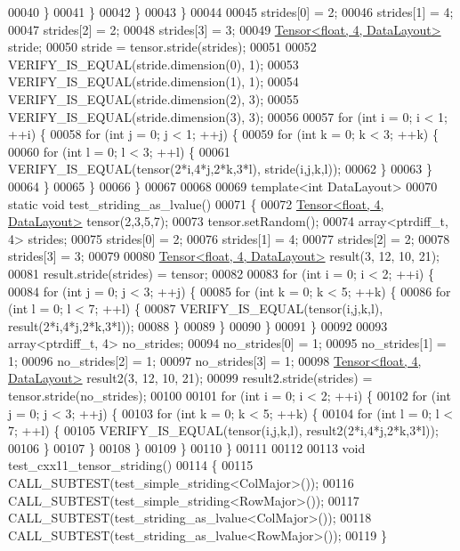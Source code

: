 \begin{DoxyCode}
00040         \}
00041       \}
00042     \}
00043   \}
00044 
00045   strides[0] = 2;
00046   strides[1] = 4;
00047   strides[2] = 2;
00048   strides[3] = 3;
00049   \hyperlink{class_eigen_1_1_tensor}{Tensor<float, 4, DataLayout>} stride;
00050   stride = tensor.stride(strides);
00051 
00052   VERIFY\_IS\_EQUAL(stride.dimension(0), 1);
00053   VERIFY\_IS\_EQUAL(stride.dimension(1), 1);
00054   VERIFY\_IS\_EQUAL(stride.dimension(2), 3);
00055   VERIFY\_IS\_EQUAL(stride.dimension(3), 3);
00056 
00057   \textcolor{keywordflow}{for} (\textcolor{keywordtype}{int} i = 0; i < 1; ++i) \{
00058     \textcolor{keywordflow}{for} (\textcolor{keywordtype}{int} j = 0; j < 1; ++j) \{
00059       \textcolor{keywordflow}{for} (\textcolor{keywordtype}{int} k = 0; k < 3; ++k) \{
00060         \textcolor{keywordflow}{for} (\textcolor{keywordtype}{int} l = 0; l < 3; ++l) \{
00061           VERIFY\_IS\_EQUAL(tensor(2*i,4*j,2*k,3*l), stride(i,j,k,l));
00062         \}
00063       \}
00064     \}
00065   \}
00066 \}
00067 
00068 
00069 \textcolor{keyword}{template}<\textcolor{keywordtype}{int} DataLayout>
00070 \textcolor{keyword}{static} \textcolor{keywordtype}{void} test\_striding\_as\_lvalue()
00071 \{
00072   \hyperlink{class_eigen_1_1_tensor}{Tensor<float, 4, DataLayout>} tensor(2,3,5,7);
00073   tensor.setRandom();
00074   array<ptrdiff\_t, 4> strides;
00075   strides[0] = 2;
00076   strides[1] = 4;
00077   strides[2] = 2;
00078   strides[3] = 3;
00079 
00080   \hyperlink{class_eigen_1_1_tensor}{Tensor<float, 4, DataLayout>} result(3, 12, 10, 21);
00081   result.stride(strides) = tensor;
00082 
00083   \textcolor{keywordflow}{for} (\textcolor{keywordtype}{int} i = 0; i < 2; ++i) \{
00084     \textcolor{keywordflow}{for} (\textcolor{keywordtype}{int} j = 0; j < 3; ++j) \{
00085       \textcolor{keywordflow}{for} (\textcolor{keywordtype}{int} k = 0; k < 5; ++k) \{
00086         \textcolor{keywordflow}{for} (\textcolor{keywordtype}{int} l = 0; l < 7; ++l) \{
00087           VERIFY\_IS\_EQUAL(tensor(i,j,k,l), result(2*i,4*j,2*k,3*l));
00088         \}
00089       \}
00090     \}
00091   \}
00092 
00093   array<ptrdiff\_t, 4> no\_strides;
00094   no\_strides[0] = 1;
00095   no\_strides[1] = 1;
00096   no\_strides[2] = 1;
00097   no\_strides[3] = 1;
00098   \hyperlink{class_eigen_1_1_tensor}{Tensor<float, 4, DataLayout>} result2(3, 12, 10, 21);
00099   result2.stride(strides) = tensor.stride(no\_strides);
00100 
00101   \textcolor{keywordflow}{for} (\textcolor{keywordtype}{int} i = 0; i < 2; ++i) \{
00102     \textcolor{keywordflow}{for} (\textcolor{keywordtype}{int} j = 0; j < 3; ++j) \{
00103       \textcolor{keywordflow}{for} (\textcolor{keywordtype}{int} k = 0; k < 5; ++k) \{
00104         \textcolor{keywordflow}{for} (\textcolor{keywordtype}{int} l = 0; l < 7; ++l) \{
00105           VERIFY\_IS\_EQUAL(tensor(i,j,k,l), result2(2*i,4*j,2*k,3*l));
00106         \}
00107       \}
00108     \}
00109   \}
00110 \}
00111 
00112 
00113 \textcolor{keywordtype}{void} test\_cxx11\_tensor\_striding()
00114 \{
00115   CALL\_SUBTEST(test\_simple\_striding<ColMajor>());
00116   CALL\_SUBTEST(test\_simple\_striding<RowMajor>());
00117   CALL\_SUBTEST(test\_striding\_as\_lvalue<ColMajor>());
00118   CALL\_SUBTEST(test\_striding\_as\_lvalue<RowMajor>());
00119 \}
\end{DoxyCode}
